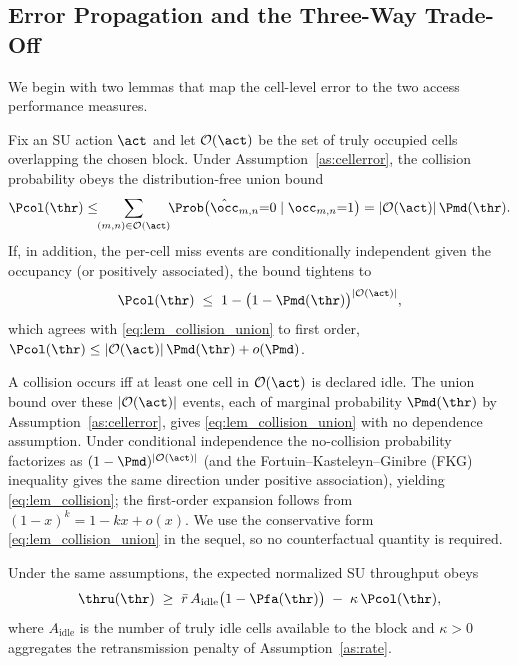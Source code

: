 \subsection{Error Propagation and the Three-Way Trade-Off}
\label{subsec:thmA}

We begin with two lemmas that map the cell-level error to the two access
performance measures.

\begin{lemma}
\label{lem:collision}
Fix an SU action $\act$ and let $\mathcal{O}(\act)$ be the set of truly
occupied cells overlapping the chosen block. Under
Assumption~\ref{as:cellerror}, the collision probability obeys the
distribution-free union bound
\begin{equation}
\Pcol(\thr)\le\!\!\sum_{(m,n)\in\mathcal{O}(\act)}\!\!
\Prob\big(\hat\occ_{m,n}{=}0\mid \occ_{m,n}{=}1\big)
=|\mathcal{O}(\act)|\,\Pmd(\thr).
\label{eq:lem_collision_union}
\end{equation}
If, in addition, the per-cell miss events are conditionally independent given
the occupancy (or positively associated), the bound tightens to
\begin{equation}
\Pcol(\thr)\;\le\;1-\bigl(1-\Pmd(\thr)\bigr)^{|\mathcal{O}(\act)|},
\label{eq:lem_collision}
\end{equation}
which agrees with \eqref{eq:lem_collision_union} to first order,
$\Pcol(\thr)\le|\mathcal{O}(\act)|\,\Pmd(\thr)+o(\Pmd)$.
\end{lemma}

\begin{IEEEproof}
A collision occurs iff at least one cell in $\mathcal{O}(\act)$ is declared
idle. The union bound over these $|\mathcal{O}(\act)|$ events, each of
marginal probability $\Pmd(\thr)$ by Assumption~\ref{as:cellerror}, gives
\eqref{eq:lem_collision_union} with no dependence assumption. Under
conditional independence the no-collision probability factorizes as
$(1-\Pmd)^{|\mathcal{O}(\act)|}$ (and the Fortuin--Kasteleyn--Ginibre (FKG)
inequality gives the same direction under positive association), yielding \eqref{eq:lem_collision};
the first-order expansion follows from $(1-x)^{k}=1-kx+o(x)$. We use the
conservative form \eqref{eq:lem_collision_union} in the sequel, so no
counterfactual quantity is required.
\end{IEEEproof}

\begin{lemma}
\label{lem:throughput}
Under the same assumptions, the expected normalized SU throughput obeys
\begin{equation}
\thru(\thr) \;\ge\; \bar{r}\,A_{\mathrm{idle}}\bigl(1-\Pfa(\thr)\bigr)
\;-\; \kappa\,\Pcol(\thr),
\label{eq:lem_throughput}
\end{equation}
where $A_{\mathrm{idle}}$ is the number of truly idle cells available to the
block and $\kappa>0$ aggregates the retransmission penalty of
Assumption~\ref{as:rate}.
\end{lemma}

